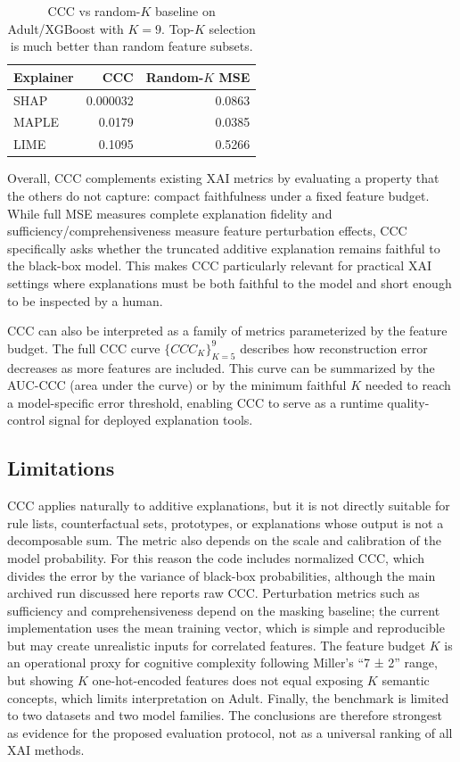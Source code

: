 \documentclass[sigconf,nonacm]{acmart}
\begin{document}
\begin{table}[t]
  \caption{CCC vs random-$K$ baseline on Adult/XGBoost with $K=9$. Top-$K$ selection
  is much better than random feature subsets.}
  \label{tab:ccc-vs-random}
  \centering
  \begin{tabular}{lrr}
    \toprule
    Explainer & CCC & Random-$K$ MSE \\
    \midrule
    SHAP  & 0.000032 & 0.0863 \\
    MAPLE & 0.0179 & 0.0385 \\
    LIME  & 0.1095 & 0.5266 \\
    \bottomrule
  \end{tabular}
\end{table}

Overall, CCC complements existing XAI metrics by evaluating a property that the
others do not capture: compact faithfulness under a fixed feature budget. While
full MSE measures complete explanation fidelity and sufficiency/comprehensiveness
measure feature perturbation effects, CCC specifically asks whether the truncated
additive explanation remains faithful to the black-box model. This makes CCC
particularly relevant for practical XAI settings where explanations must be both
faithful to the model and short enough to be inspected by a human.

CCC can also be interpreted as a family of metrics parameterized by the feature
budget. The full CCC curve $\{CCC_K\}_{K=5}^9$ describes how reconstruction
error decreases as more features are included. This curve can be summarized
by the AUC-CCC (area under the curve) or by the minimum faithful $K$ needed
to reach a model-specific error threshold, enabling CCC to serve as a runtime
quality-control signal for deployed explanation tools.

\subsection{Limitations}
CCC applies naturally to additive explanations, but it is not directly suitable
for rule lists, counterfactual sets, prototypes, or explanations whose output is
not a decomposable sum. The metric also depends on the scale and calibration of
the model probability. For this reason the code includes normalized CCC, which
divides the error by the variance of black-box probabilities, although the main
archived run discussed here reports raw CCC. Perturbation metrics such as
sufficiency and comprehensiveness depend on the masking baseline; the current
implementation uses the mean training vector, which is simple and reproducible
but may create unrealistic inputs for correlated features. The feature budget $K$
is an operational proxy for cognitive complexity following Miller's ``7 ± 2'' range,
but showing $K$ one-hot-encoded features does not equal exposing $K$ semantic
concepts, which limits interpretation on Adult. Finally, the benchmark is limited
to two datasets and two model families. The conclusions are therefore strongest
as evidence for the proposed evaluation protocol, not as a universal ranking of
all XAI methods.
\end{document}
